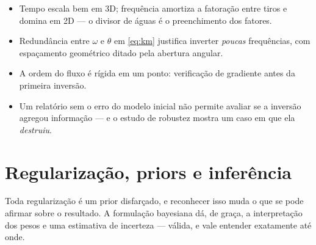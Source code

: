 \documentclass[11pt,a4paper,oneside]{report}
\begin{document}
\begin{resumo}
\begin{itemize}[leftmargin=*, itemsep=1pt]
\item Tempo escala bem em 3D; frequ\^encia amortiza a fatora\c{c}\~ao entre
tiros e domina em 2D --- o divisor de \'aguas \'e o preenchimento dos fatores.
\item Redund\^ancia entre $\omega$ e $\theta$ em \eqref{eq:km} justifica
inverter \emph{poucas} frequ\^encias, com espa\c{c}amento geom\'etrico ditado
pela abertura angular.
\item A ordem do fluxo \'e r\'igida em um ponto: verifica\c{c}\~ao de gradiente
antes da primeira invers\~ao.
\item Um relat\'orio sem o erro do modelo inicial n\~ao permite avaliar se a
invers\~ao agregou informa\c{c}\~ao --- e o estudo de robustez mostra um caso
em que ela \emph{destruiu}.
\end{itemize}
\end{resumo}

\chapter{Regulariza\c{c}\~ao, priors e infer\^encia}
\label{cap:regularizacao}

\begin{ideia}
Toda regulariza\c{c}\~ao \'e um prior disfar\c{c}ado, e reconhecer isso muda o
que se pode afirmar sobre o resultado. A formula\c{c}\~ao bayesiana d\'a, de
gra\c{c}a, a interpreta\c{c}\~ao dos pesos e uma estimativa de incerteza ---
v\'alida, e vale entender exatamente at\'e onde.
\end{ideia}
\end{document}

